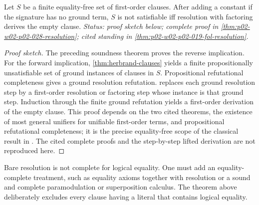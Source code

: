 \begin{theorem}
\label{thm:fol-resolution}
Let \(S\) be a finite equality-free set of first-order clauses.  After adding
a constant if the signature has no ground term, \(S\) is not satisfiable iff
resolution with factoring derives the empty clause.
\textit{Status: proof sketch below; complete proof in \cref{thm:p02-w02-p02-028-resolution}; cited standing in \cref{thm:p02-w02-p02-019-fol-resolution}.}
\end{theorem}
\begin{proof}[Proof sketch]
The preceding soundness theorem proves the reverse implication.  For the
forward implication, \cref{thm:herbrand-clauses} yields a finite propositionally
unsatisfiable set of ground instances of clauses in \(S\).  Propositional
refutational completeness gives a ground resolution refutation.
 replaces each ground resolution step by a first-order resolution or
factoring step whose instance is that ground step.  Induction through the
finite ground refutation yields a first-order derivation of the empty clause.
This proof depends on the two cited theorems, the existence of most general
unifiers for unifiable first-order terms, and propositional refutational
completeness; it is the
precise equality-free scope of the classical result in
\cite{Robinson1965,BachmairGanzinger2001}.  The cited complete proofs and the
step-by-step lifted derivation are not reproduced here.
\end{proof}

Bare resolution is not complete for logical equality.  One must add
an equality-complete treatment, such as equality axioms together with
resolution or a sound and complete paramodulation or superposition calculus.
The theorem above deliberately excludes every clause having a literal that
contains logical equality.

